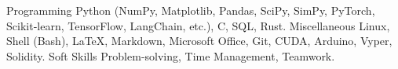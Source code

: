 \begin{cvskills}
  \cvskill
    {Programming} %
    {Python (NumPy, Matplotlib, Pandas, SciPy, SimPy, PyTorch, Scikit‑learn, TensorFlow, LangChain, etc.), C, SQL, Rust.} %
  \cvskill
    {Miscellaneous} %
    {Linux, Shell (Bash), LaTeX, Markdown, Microsoft Office, Git, CUDA, Arduino, Vyper, Solidity.} %
  \cvskill
    {Soft Skills} %
    {Problem-solving, Time Management, Teamwork.} %
\end{cvskills}
